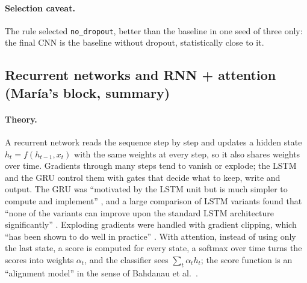 \paragraph{Selection caveat.} The rule selected \texttt{no\_dropout}, better than the baseline in one
seed of three only: the final CNN is the baseline without dropout, statistically close to it.

\subsection{Recurrent networks and RNN + attention (Mar\'ia's block, summary)}\label{sec:rnn}

\paragraph{Theory.} A recurrent network reads the sequence step by step and updates a hidden state
$h_t = f(h_{t-1}, x_t)$ with the same weights at every step, so it also shares weights over time.
Gradients through many steps tend to vanish or explode; the LSTM and the GRU control them with gates
that decide what to keep, write and output. The GRU was ``motivated by the LSTM unit but is much
simpler to compute and implement'' \cite[p.~1725]{cho2014learning}, and a large comparison of LSTM
variants found that ``none of the variants can improve upon the standard LSTM architecture
significantly'' \cite[p.~1]{greff2017lstm}. Exploding gradients were handled with gradient clipping,
which ``has been shown to do well in practice'' \cite[p.~6]{pascanu2013difficulty}. With attention,
instead of using only the last state, a score is computed for every state, a softmax over time turns
the scores into weights $\alpha_t$, and the classifier sees $\sum_t \alpha_t h_t$; the score function is
an ``alignment model'' in the sense of Bahdanau et al.\ \cite[p.~3]{bahdanau2015neural}.

